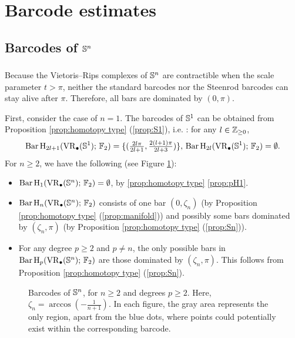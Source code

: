 
\section{Barcode estimates}\label{s:computations}

\subsection{Barcodes of $\mathbb{S}^n$}\label{ss:Sn}

\subsubsection{}

Because the Vietoris--Rips complexes of $\mathbb{S}^n$ are contractible when the scale parameter $t>\pi$, neither the standard barcodes nor the Steenrod barcodes can stay alive after $\pi$.
Therefore, all bars are dominated by $(0,\pi)$.

First, consider the case of $n=1$.
The barcodes of $\mathbb{S}^1$ can be obtained from Proposition \ref{prop:homotopy type} (\ref{prop:S1}), i.e. \cite[Theorem~7.4]{adamaszek2017vietoris}: for any $l \in \mathbb{Z}_{\geq 0}$,
\begin{equation}\label{eq:barc of S1}
	\operatorname{Bar} \operatorname{H}_{2l+1}(\operatorname{VR}_\bullet(\mathbb{S}^1);\,{\mathbb{F}_2})=\{(\tfrac{2l\pi}{2l+1},\tfrac{2(l+1)\pi}{2l+3})\},\, \operatorname{Bar} \operatorname{H}_{2l}(\operatorname{VR}_\bullet(\mathbb{S}^1);\,{\mathbb{F}_2})=\emptyset.
\end{equation}
For $n\geq 2$, we have the following (see Figure \ref{fig:Sk}):
\begin{itemize}
	\item $\operatorname{Bar} \operatorname{H}_{1}(\operatorname{VR}_\bullet(\mathbb{S}^n);\,{\mathbb{F}_2}) = \emptyset$, by \cref{prop:homotopy type} \cref{prop:pH1}.
	\item $\operatorname{Bar} \operatorname{H}_{n}(\operatorname{VR}_\bullet(\mathbb{S}^n);\,{\mathbb{F}_2})$ consists of one bar $(0,\zeta_n)$ (by Proposition \ref{prop:homotopy type} (\ref{prop:manifold})) and possibly some bars dominated by $(\zeta_n,\pi)$ (by Proposition \ref{prop:homotopy type} (\ref{prop:Sn})).
	\item For any degree $p\geq 2$ and $p\neq n$, the only possible bars in $\operatorname{Bar} \operatorname{H}_{p}(\operatorname{VR}_\bullet(\mathbb{S}^n);\,{\mathbb{F}_2})$ are those dominated by $(\zeta_n,\pi)$.
	This follows from Proposition \ref{prop:homotopy type} (\ref{prop:Sn}).
\end{itemize}

\begin{figure}[ht]
	\centering
	
	\caption{Barcodes of $\mathbb{S}^n$, for $n\geq 2$ and degrees $p\geq 2$.
		Here, $\zeta_n=\arccos(-\frac{1}{n+1})$.
		In each figure, the gray area represents the only region, apart from the blue dots, where points could potentially exist within the corresponding barcode.}
	\label{fig:Sk}
\end{figure}

